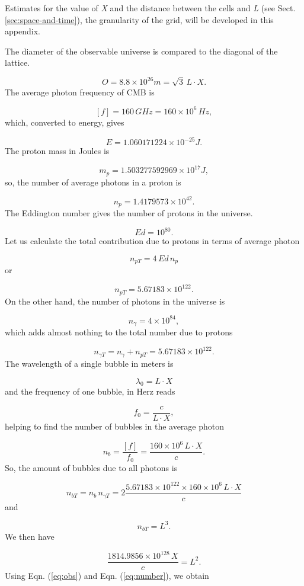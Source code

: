 \documentclass[12pt,english]{article}
\begin{document}
Estimates for the value of \emph{X} and the distance between the cells
and \emph{L} (see Sect. \ref{sec:space-and-time}), the granularity
of the grid, will be developed in this appendix.

The diameter of the observable universe \cite{halpbern} is compared
to the diagonal of the lattice.

\begin{equation}
O=8.8\times10^{26}m=\sqrt{3}\,L\cdot X.\label{eq:obs}
\end{equation}
The average photon frequency of CMB \cite{archeops} is

\[
[f]=160\,GHz=160\times10^{6}\,Hz,
\]
which, converted to energy, gives

\[
E=1.060171224\times10^{-25}J.
\]
The proton mass in Joules is

\[
m_{p}=1.503277592969\times10^{17}J,
\]
so, the number of average photons in a proton is

\[
n_{p}=1.4179573\times10^{42}.
\]
The Eddington number gives the number of protons in the universe.

\[
Ed=10^{80}.
\]
Let us calculate the total contribution due to protons in terms of
average photon

\[
n_{pT}=4\,Ed\,n_{p}
\]
or

\[
n_{pT}=5.67183\times10^{122}.
\]
On the other hand, the number of photons in the universe is

\[
n_{\gamma}=4\times10^{84},
\]
which adds almost nothing to the total number due to protons

\[
n_{\gamma T}=n_{\gamma}+n_{pT}=5.67183\times10^{122}.
\]
The wavelength of a single bubble in meters is

\[
\lambda_{0}=L\cdot X
\]
and the frequency of one bubble, in Herz reads

\[
f_{0}=\frac{c}{L\cdot X},
\]
helping to find the number of bubbles in the average photon

\[
n_{b}=\frac{[f]}{f_{0}}=\frac{160\times10^{6}\,L\cdot X}{c}.
\]
So, the amount of bubbles due to all photons is

\[
n_{bT}=n_{b}\,n_{\gamma T}=2\frac{5.67183\times10^{122}\times160\times10^{6}\,L\cdot X}{c}
\]
and

\[
n_{bT}=L^{3}.
\]
We then have

\begin{equation}
\frac{1814.9856\times10^{128}\,X}{c}=L^{2}.\label{eq:number}
\end{equation}
Using Eqn. (\ref{eq:obs}) and Eqn. (\ref{eq:number}), we obtain 
\end{document}
